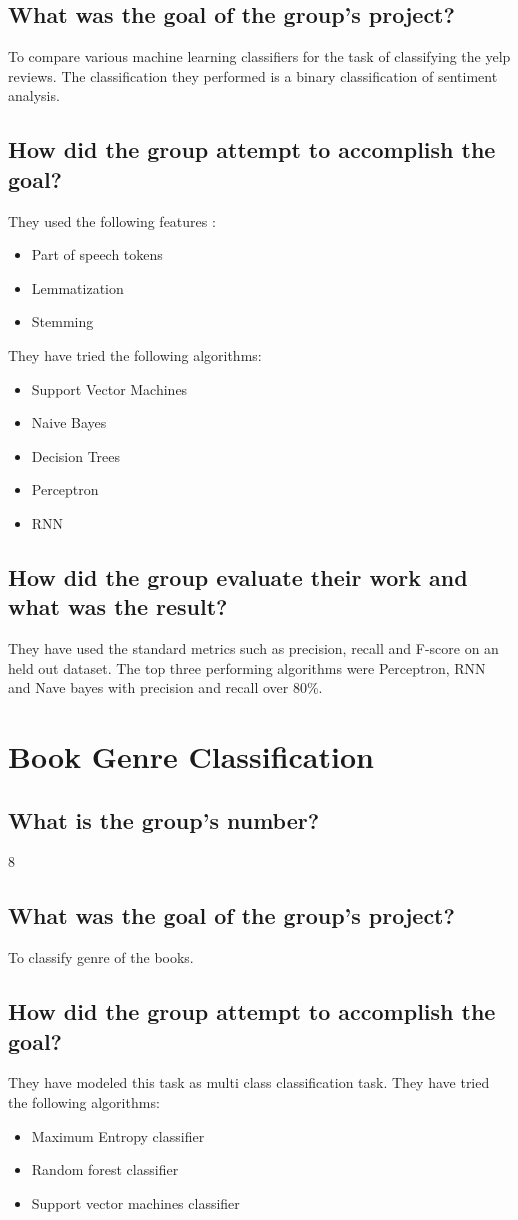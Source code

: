 \documentclass[letterpaper]{article}
\begin{document}
\subsection{What was the goal of the group's project?}
To compare various machine learning classifiers for the task of classifying the yelp reviews. The classification they performed is a binary classification of sentiment analysis.
\subsection{How did the group attempt to accomplish the goal?}
They used the following features :
\begin{itemize}
	\item Part of speech tokens
	\item Lemmatization
	\item Stemming
\end{itemize}
They have tried the following algorithms:
\begin{itemize}
	\item Support Vector Machines
	\item Naive Bayes
	\item Decision Trees
	\item Perceptron
	\item RNN
\end{itemize}

\subsection{How did the group evaluate their work and what was the result?}
They have used the standard metrics such as precision, recall and F-score on an held out dataset.
The top three performing algorithms were Perceptron, RNN and Nave bayes with precision and recall over 80\%.

\section{Book Genre Classification}
\subsection{What is the group's number?}
8
\subsection{What was the goal of the group's project?}
To classify genre of the books.
\subsection{How did the group attempt to accomplish the goal?}
They have modeled this task as multi class classification task. They have tried the following algorithms:
\begin{itemize}
	\item Maximum Entropy classifier
	\item Random forest classifier
	\item Support vector machines classifier
\end{itemize}
\end{document}
